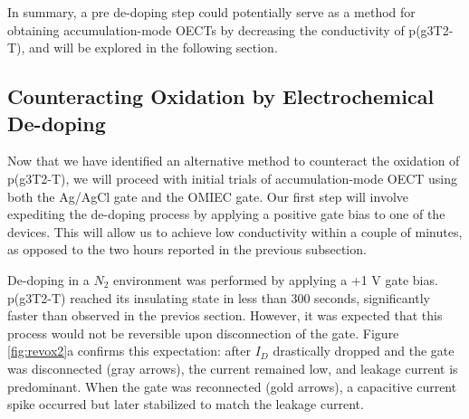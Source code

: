 In summary, a pre de-doping step could potentially serve as a method for obtaining accumulation-mode OECTs by decreasing the conductivity of p(g3T2-T), and will be explored in the following section.

\subsection{Counteracting Oxidation by Electrochemical De-doping} \label{subsec:revox}
Now that we have identified an alternative method to counteract the oxidation of p(g3T2-T), we will proceed with initial trials of accumulation-mode OECT using both the Ag/AgCl gate and the OMIEC gate. Our first step will involve expediting the de-doping process by applying a positive gate bias to one of the devices. This will allow us to achieve low conductivity within a couple of minutes, as opposed to the two hours reported in the previous subsection. 

De-doping in a $N_{2}$ environment was performed by applying a +1 V gate bias. p(g3T2-T) reached its insulating state in less than 300 seconds, significantly faster than observed in the previos section. However, it was expected that this process would not be reversible upon disconnection of the gate. Figure \ref{fig:revox2}a confirms this expectation: after $I_{D}$ drastically dropped and the gate was disconnected (gray arrows), the current remained low, and leakage current is predominant. When the gate was reconnected (gold arrows), a capacitive current spike occurred but later stabilized to match the leakage current.

